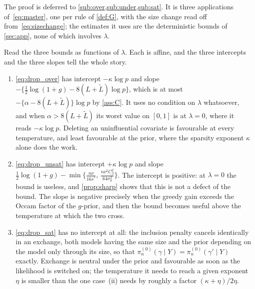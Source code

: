 \documentclass[aos]{imsart}
\newcommand{\Ltil}{\widetilde{L}}
\newcommand{\gainfloorsm}{%
    \min\bigl\{\tfrac{n\nu}{16s^{\ast}},\,
    \tfrac{n\nu^{2}C_\beta^{2}}{64\sigma_0^{2}}\bigr\}}
\theoremstyle{plain}
\theoremstyle{definition}
\begin{document}
    The proof is deferred to \cref{sub:over,sub:under,sub:sat}. It is three
    applications of~\eqref{eq:master}, one per rule of \cref{def:G}, with
    the size change read off from~\eqref{eq:sizechange}; the estimates it
    uses are the deterministic bounds of \cref{sec:app}, none of which
    involves $\lambda$.

    Read the three bounds as functions of $\lambda$. Each is affine, and the
    three intercepts and the three slopes tell the whole story.

    \begin{enumerate}[label=(\roman*),leftmargin=2.6em]
        \item \eqref{eq:drop_over} has intercept $-\kappa\log p$ and slope
        $-\{\tfrac12\log(1+g)-8(L+\Ltil)\log p\}$, which is at most
        $-\{\alpha-8(L+\Ltil)\}\log p$ by \cref{ass:C}. It uses no condition
        on $\lambda$ whatsoever, and when $\alpha>8(L+\Ltil)$ its worst
        value on $[0,1]$ is at $\lambda=0$, where it reads $-\kappa\log p$.
        Deleting an uninfluential covariate is favourable at every
        temperature, and least favourable at the prior, where the sparsity
        exponent $\kappa$ alone does the work.
        \item \eqref{eq:drop_unsat} has intercept $+\kappa\log p$ and slope
        $\tfrac12\log(1+g)-\gainfloorsm$. The intercept is positive: at
        $\lambda=0$ the bound is useless, and \cref{prop:sharp} shows that
        this is not a defect of the bound. The slope is negative precisely
        when the greedy gain exceeds the Occam factor of the $g$-prior, and
        then the bound becomes useful above the temperature at which the two
        cross.
        \item \eqref{eq:drop_sat} has no intercept at all: the inclusion
        penalty cancels identically in an exchange, both models having the
        same size and the prior depending on the model only through its
        size, so that $\pi_n^{(0)}(\gamma\mid Y)=\pi_n^{(0)}(\gamma'\mid Y)$
        exactly. Exchange is neutral under the prior and favourable as soon
        as the likelihood is switched on; the temperature it needs to reach
        a given exponent $\eta$ is smaller than the one case~(ii) needs by
        roughly a factor $(\kappa+\eta)/2\eta$.
    \end{enumerate}
\end{document}
